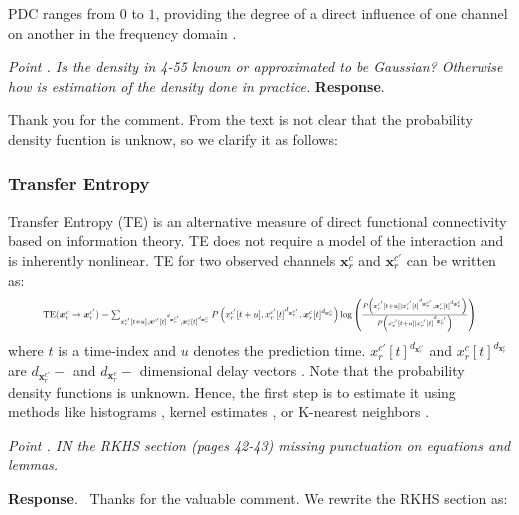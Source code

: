 \documentclass[runningheads]{llncs}
\newcommand{\ve}[1]{\bm {#1}}
\newenvironment{reviewer}{\setcounter{pointcounter}{1}}{}
\newcommand{\changes}[1]{\textcolor[rgb]{1.00,0.00,0.00}{#1}}
\newcommand{\point}[1]{\medskip \noindent
  \textsl{{\fontseries{b}\selectfont Point \thepointcounter}.
\stepcounter{pointcounter} #1}}
\newcommand{\reply}{\medskip \noindent \textbf{Response}.\ }
\begin{document}
\begin{reviewer}
{    PDC ranges from $0$ to $1$, providing the degree of a direct
    influence of one channel on another in the frequency domain
    \cite{gaxiola2017using}.

  }

  \point{Is the density in 4-55 known or approximated to be Gaussian?
  Otherwise how is estimation of the density done in practice.}
  \reply{
    Thank you for the comment. From the text is not clear that the
    probability density fucntion is unknow, so we clarify it as follows:
    \subsubsection{Transfer Entropy}

    Transfer Entropy  (TE) is an alternative measure of direct
    functional connectivity based on information theory. TE does not
    require a model of the interaction and is inherently nonlinear.
    \changes{TE for two observed channels $\ve{x}^{c}_{r}$ and
      $\ve{x}^{c'}_{r}$ can be written as:
      \begin{equation}
        \resizebox{0.9\textwidth}{!}{$\operatorname{TE}(\ve{x}^{c}_{r}
          \rightarrow \ve{x}^{c'}_{r}) = \sum_{x^{c'}_{r}[t+u],
            \ve{x}^{c'}[t]^{d_{\ve{x}^{c'}_{r}}},
          \ve{x}^{c}_{r}[t]^{d_{\ve{x}^{c}_{r}}}} P\left(
            x^{c'}_{r}[t+u], x^{c'}_{r}[t]^{d_{\ve{x}^{c'}_{r}}},
          \ve{x}^{c}_{r}[t]^{d_{\ve{x}^{c}_{r}}} \right) \log \left(
            \frac{P\left( x^{c'}_{r}[t+u] \mid
                x^{c'}_{r}[t]^{d_{\ve{x}^{c'}_{r}}},
            \ve{x}^{c}_{r}[t]^{d_{\ve{x}^{c}_{r}}} \right)}{P\left(
                x^{c'}_{r}[t+u] \mid x^{c'}_{r}[t]^{d_{\ve{x}^{c'}_{r}}}
          \right)} \right)
        $}
      \end{equation}
      where $t$ is a time-index and $u$ denotes the prediction time.
      $x^{c'}_{r}[t]^{d_{\ve{x}^{c'}_{r}}}$ and
      $x^{c}_{r}[t]^{d_{\ve{x}^{c}_{r}}}$ are $d_{\ve{x}^{c'}_{r}}-$
      and $d_{\ve{x}^{c}_{r}}-$ dimensional delay vectors
      \cite{rezaei2023classification}. Note that the probability
      density functions is unknown. Hence, the first step is to
      estimate it using methods like histograms
      \cite{choi2021detecting}, kernel estimates
    \cite{kuang2021measuring}, or K-nearest neighbors \cite{martinez2020can}.}
  }

  \point{IN the RKHS section (pages 42-43) missing punctuation on
  equations and lemmas.}

  \reply{
    Thanks for the valuable comment. We rewrite the RKHS section as:
}
\end{reviewer}
\end{document}
